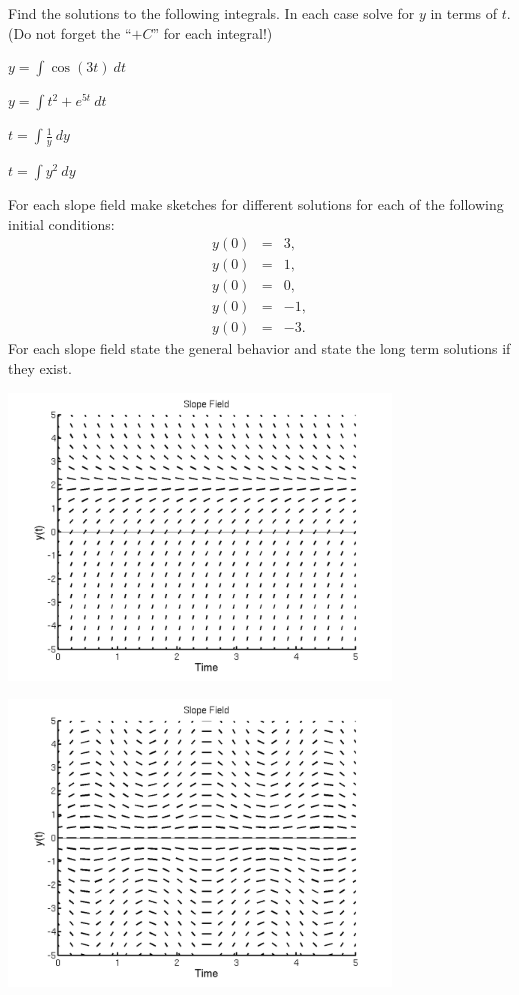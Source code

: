 
\begin{problem}
\item Find the solutions to the following integrals. In each case
  solve for $y$ in terms of $t$. (Do not forget the ``$+C$'' for each
  integral!)
  \begin{subproblem}
    \item $y = \int \cos(3t) ~ dt$
      \vfill
    \item $y = \int t^2 + e^{5t} ~ dt$
      \vfill
    \item $t = \int \frac{1}{y} ~ dy$
      \vfill
    \item $t = \int y^2 ~ dy$
      \vfill
  \end{subproblem}

\clearpage

\item For each slope field make sketches for different solutions for
  each of the following initial conditions:
  \begin{eqnarray*}
    y(0) & = & 3, \\
    y(0) & = & 1, \\
    y(0) & = & 0, \\
    y(0) & = & -1, \\
    y(0) & = & -3.
  \end{eqnarray*}
  For each slope field state the general behavior and state the long
  term solutions if they exist.

  \begin{subproblem}
    \item \includegraphics[height=3.0in]{sfSteadyWk1}
    \item \includegraphics[height=3.0in]{sfOscillateWk1}


\end{subproblem}
\end{problem}
